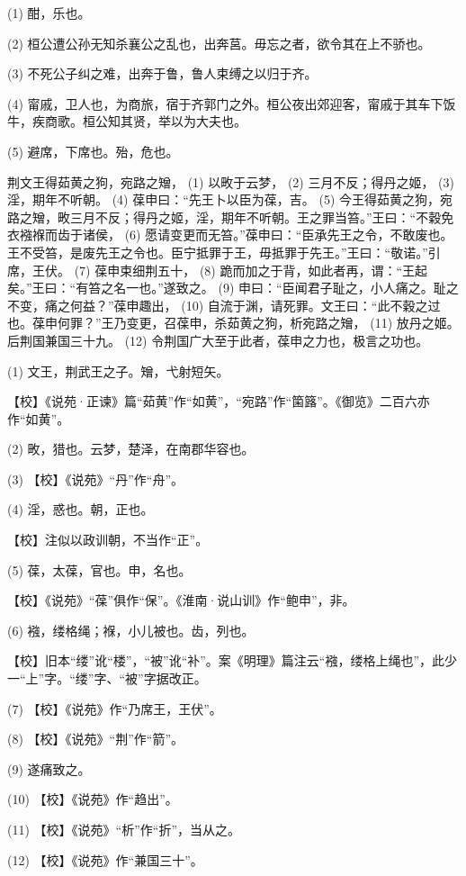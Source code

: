 \documentclass[12pt,UTF8]{ctexbook}
\begin{document}
(1) 酣，乐也。

(2) 桓公遭公孙无知杀襄公之乱也，出奔莒。毋忘之者，欲令其在上不骄也。

(3) 不死公子纠之难，出奔于鲁，鲁人束缚之以归于齐。

(4) 甯戚，卫人也，为商旅，宿于齐郭门之外。桓公夜出郊迎客，甯戚于其车下饭牛，疾商歌。桓公知其贤，举以为大夫也。

(5) 避席，下席也。殆，危也。

荆文王得茹黄之狗，宛路之矰， (1) 以畋于云梦， (2) 三月不反；得丹之姬， (3) 淫，期年不听朝。 (4) 葆申曰：“先王卜以臣为葆，吉。 (5) 今王得茹黄之狗，宛路之矰，畋三月不反；得丹之姬，淫，期年不听朝。王之罪当笞。”王曰：“不穀免衣襁褓而齿于诸侯， (6) 愿请变更而无笞。”葆申曰：“臣承先王之令，不敢废也。王不受笞，是废先王之令也。臣宁抵罪于王，毋抵罪于先王。”王曰：“敬诺。”引席，王伏。 (7) 葆申束细荆五十， (8) 跪而加之于背，如此者再，谓：“王起矣。”王曰：“有笞之名一也。”遂致之。 (9) 申曰：“臣闻君子耻之，小人痛之。耻之不变，痛之何益？”葆申趣出， (10) 自流于渊，请死罪。文王曰：“此不穀之过也。葆申何罪？”王乃变更，召葆申，杀茹黄之狗，析宛路之矰， (11) 放丹之姬。后荆国兼国三十九。 (12) 令荆国广大至于此者，葆申之力也，极言之功也。

(1) 文王，荆武王之子。矰，弋射短矢。

【校】《说苑·正谏》篇“茹黄”作“如黄”，“宛路”作“箘簬”。《御览》二百六亦作“如黄”。

(2) 畋，猎也。云梦，楚泽，在南郡华容也。

(3) 【校】《说苑》“丹”作“舟”。

(4) 淫，惑也。朝，正也。

【校】注似以政训朝，不当作“正”。

(5) 葆，太葆，官也。申，名也。

【校】《说苑》“葆”俱作“保”。《淮南·说山训》作“鲍申”，非。

(6) 襁，缕格绳；褓，小儿被也。齿，列也。

【校】旧本“缕”讹“楼”，“被”讹“补”。案《明理》篇注云“襁，缕格上绳也”，此少一“上”字。“缕”字、“被”字据改正。

(7) 【校】《说苑》作“乃席王，王伏”。

(8) 【校】《说苑》“荆”作“箭”。

(9) 遂痛致之。

(10) 【校】《说苑》作“趋出”。

(11) 【校】《说苑》“析”作“折”，当从之。

(12) 【校】《说苑》作“兼国三十”。
\end{document}

